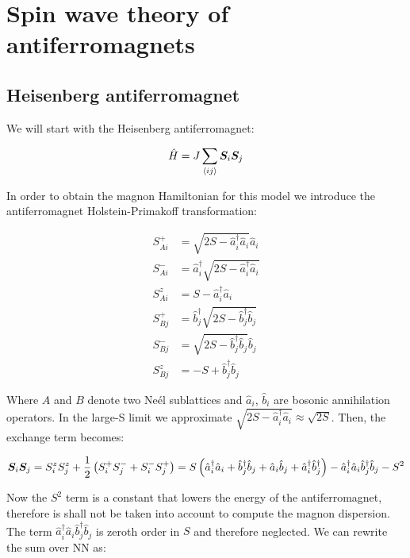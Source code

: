 \chapter{Spin wave theory of antiferromagnets}
\label{SpinWave}

\section{Heisenberg antiferromagnet}

We will start with the Heisenberg antiferromagnet:

\begin{equation}
\hat{H} = J \sum_{\langle i j \rangle} \boldsymbol{S}_i \boldsymbol{S}_j
\end{equation}

In order to obtain the magnon Hamiltonian for this model we introduce the antiferromagnet Holstein-Primakoff transformation:

\begin{align}
S^+_{Ai} &= \sqrt{2S-\hat{a}^\dagger_i \hat{a}_i} \hat{a}_i \\
S^-_{Ai} &= \hat{a}^\dagger_i\sqrt{2S-\hat{a}^\dagger_i \hat{a}_i}  \\
S^z_{Ai} &= S - \hat{a}^\dagger_i \hat{a}_i \\
S^+_{Bj} &=\hat{b}^\dagger_j\sqrt{2S-\hat{b}^\dagger_j \hat{b}_j} \\
S^-_{Bj} &= \sqrt{2S-\hat{b}^\dagger_j \hat{b}_j} \hat{b}_j \\
S^z_{Bj} &= -S + \hat{b}^\dagger_j \hat{b}_j
\end{align}

Where $A$ and $B$ denote two Ne\'{e}l sublattices and $\hat{a}_i$, $\hat{b}_i$ are bosonic annihilation operators. In the large-S limit we approximate $ \sqrt{2S-\hat{a}^\dagger_i \hat{a}_i} \approx \sqrt{2S}$. Then, the exchange term becomes:

\begin{align*}
\boldsymbol{S}_i\boldsymbol{S}_j = S_i^zS_j^z + \frac{1}{2}\left(S_i^+S_j^- + S_i^-S_j^+ \right) = S \left( \hat{a}^\dagger_i \hat{a}_i + \hat{b}^\dagger_j \hat{b}_j + \hat{a}_i\hat{b}_j + \hat{a}^\dagger_i\hat{b}^\dagger_j \right) - \hat{a}^\dagger_i \hat{a}_i\hat{b}^\dagger_j \hat{b}_j - S^2
\end{align*}

Now the $S^2$ term is a constant that lowers the energy of the antiferromagnet, therefore is shall not be taken into account to compute the magnon dispersion. The term $\hat{a}^\dagger_i \hat{a}_i\hat{b}^\dagger_j \hat{b}_j$ is zeroth order in $S$ and therefore neglected. We can rewrite the sum over NN as:

